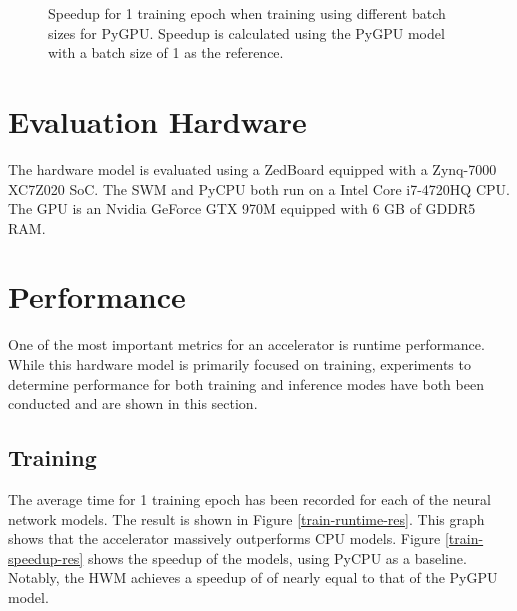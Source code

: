\begin{figure}
	\centering
	\caption{Speedup for 1 training epoch when training using different batch sizes for PyGPU. Speedup is calculated using the PyGPU model with a batch size of 1 as the reference.}
	\label{gpu-speedup}
\end{figure}

\section{Evaluation Hardware}
The hardware model is evaluated using a ZedBoard equipped with a Zynq-7000 XC7Z020 SoC. The SWM and PyCPU both run on a Intel Core i7-4720HQ CPU. The GPU is an Nvidia GeForce GTX 970M equipped with 6 GB of GDDR5 RAM.

\section{Performance}
One of the most important metrics for an accelerator is runtime performance. 
While this hardware model is primarily focused on training, experiments to determine performance for both training and inference modes have both been conducted and are shown in this section.

\subsection{Training}
The average time for 1 training epoch has been recorded for each of the neural network models. The result is shown in Figure \ref{train-runtime-res}. This graph shows that the accelerator massively outperforms CPU models. Figure \ref{train-speedup-res} shows the speedup of the models, using PyCPU as a baseline. Notably, the HWM achieves a speedup of of nearly equal to that of the PyGPU model.

